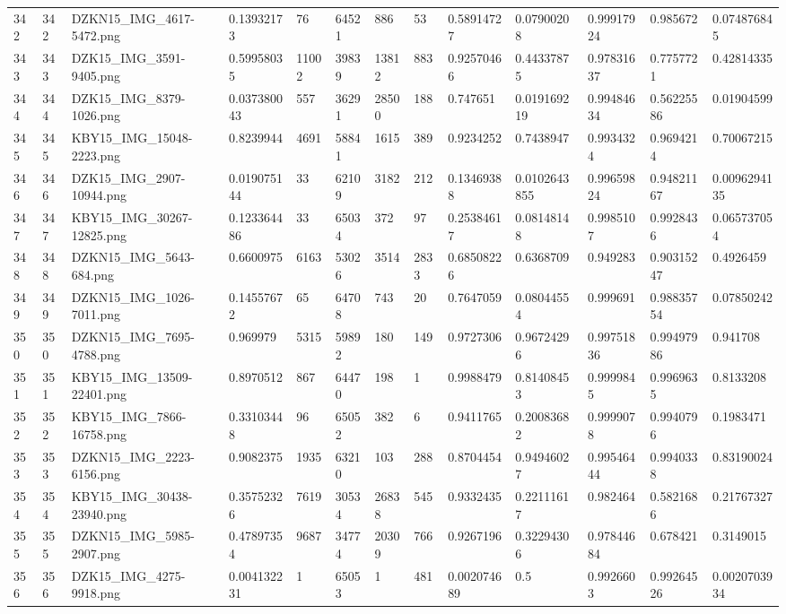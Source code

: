 \documentclass[11pt, a4paper, twoside]{report}
\begin{document}
\begin{longtable}[c]{@{}lllllllllllll@{}}
342 & 342 & DZKN15\_IMG\_4617-5472.png & 0.13932173 & 76 & 64521 & 886 & 53 & 0.58914727 & 0.07900208 & 0.99917924 & 0.985672 & 0.074876845 \\
343 & 343 & DZK15\_IMG\_3591-9405.png & 0.59958035 & 11002 & 39839 & 13812 & 883 & 0.92570466 & 0.44337875 & 0.97831637 & 0.7757721 & 0.42814335 \\
344 & 344 & DZK15\_IMG\_8379-1026.png & 0.037380043 & 557 & 36291 & 28500 & 188 & 0.747651 & 0.019169219 & 0.99484634 & 0.56225586 & 0.01904599 \\
345 & 345 & KBY15\_IMG\_15048-2223.png & 0.8239944 & 4691 & 58841 & 1615 & 389 & 0.9234252 & 0.7438947 & 0.9934324 & 0.9694214 & 0.70067215 \\
346 & 346 & DZK15\_IMG\_2907-10944.png & 0.019075144 & 33 & 62109 & 3182 & 212 & 0.13469388 & 0.0102643855 & 0.99659824 & 0.94821167 & 0.0096294135 \\
347 & 347 & KBY15\_IMG\_30267-12825.png & 0.123364486 & 33 & 65034 & 372 & 97 & 0.25384617 & 0.08148148 & 0.9985107 & 0.9928436 & 0.065737054 \\
348 & 348 & DZKN15\_IMG\_5643-684.png & 0.6600975 & 6163 & 53026 & 3514 & 2833 & 0.68508226 & 0.6368709 & 0.949283 & 0.90315247 & 0.4926459 \\
349 & 349 & DZKN15\_IMG\_1026-7011.png & 0.14557672 & 65 & 64708 & 743 & 20 & 0.7647059 & 0.08044554 & 0.999691 & 0.98835754 & 0.07850242 \\
350 & 350 & DZKN15\_IMG\_7695-4788.png & 0.969979 & 5315 & 59892 & 180 & 149 & 0.9727306 & 0.96724296 & 0.99751836 & 0.99497986 & 0.941708 \\
351 & 351 & KBY15\_IMG\_13509-22401.png & 0.8970512 & 867 & 64470 & 198 & 1 & 0.9988479 & 0.81408453 & 0.9999845 & 0.9969635 & 0.8133208 \\
352 & 352 & KBY15\_IMG\_7866-16758.png & 0.33103448 & 96 & 65052 & 382 & 6 & 0.9411765 & 0.20083682 & 0.9999078 & 0.9940796 & 0.1983471 \\
353 & 353 & DZKN15\_IMG\_2223-6156.png & 0.9082375 & 1935 & 63210 & 103 & 288 & 0.8704454 & 0.94946027 & 0.99546444 & 0.9940338 & 0.83190024 \\
354 & 354 & KBY15\_IMG\_30438-23940.png & 0.35752326 & 7619 & 30534 & 26838 & 545 & 0.9332435 & 0.22111617 & 0.982464 & 0.5821686 & 0.21767327 \\
355 & 355 & DZKN15\_IMG\_5985-2907.png & 0.47897354 & 9687 & 34774 & 20309 & 766 & 0.9267196 & 0.32294306 & 0.97844684 & 0.678421 & 0.3149015 \\
356 & 356 & DZK15\_IMG\_4275-9918.png & 0.004132231 & 1 & 65053 & 1 & 481 & 0.002074689 & 0.5 & 0.9926603 & 0.99264526 & 0.0020703934 \\

\end{longtable}
\end{document}
